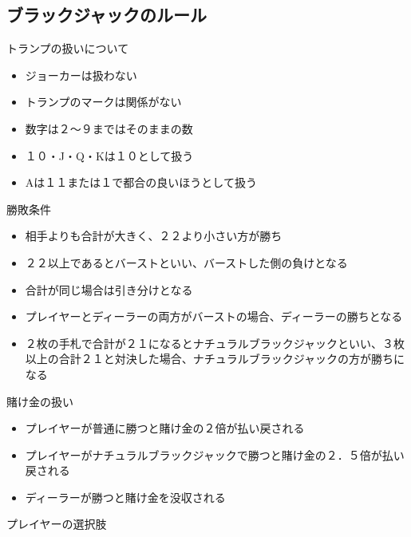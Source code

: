 \subsection{ブラックジャックのルール}
トランプの扱いについて
\begin{itemize}
\item ジョーカーは扱わない
\item トランプのマークは関係がない
\item 数字は２～９まではそのままの数
\item １０・J・Q・Kは１０として扱う
\item Aは１１または１で都合の良いほうとして扱う
\end{itemize}
勝敗条件
\begin{itemize}
\item 相手よりも合計が大きく、２２より小さい方が勝ち
\item ２２以上であるとバーストといい、バーストした側の負けとなる
\item 合計が同じ場合は引き分けとなる
\item プレイヤーとディーラーの両方がバーストの場合、ディーラーの勝ちとなる
\item ２枚の手札で合計が２１になるとナチュラルブラックジャックといい、３枚以上の合計２１と対決した場合、ナチュラルブラックジャックの方が勝ちになる
\end{itemize}
賭け金の扱い
\begin{itemize}
\item プレイヤーが普通に勝つと賭け金の２倍が払い戻される
\item プレイヤーがナチュラルブラックジャックで勝つと賭け金の２．５倍が払い戻される
\item ディーラーが勝つと賭け金を没収される
\end{itemize}
プレイヤーの選択肢
